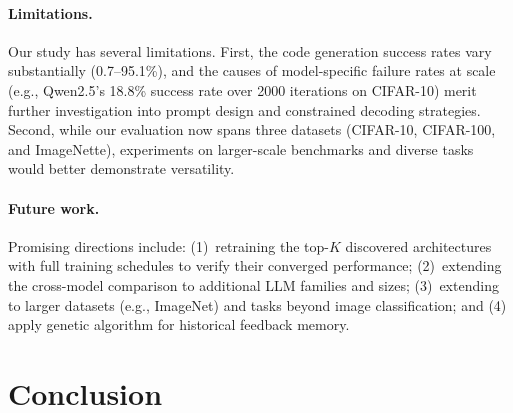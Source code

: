 \documentclass[10pt,twocolumn,letterpaper]{article}
\begin{document}
	\paragraph{Limitations.}
	Our study has several limitations. First, the code generation success rates vary substantially (0.7--95.1\%), and the causes of model-specific failure rates at scale (e.g., Qwen2.5's 18.8\% success rate over 2000 iterations on CIFAR-10) merit further investigation into prompt design and constrained decoding strategies. Second, while our evaluation now spans three datasets (CIFAR-10, CIFAR-100, and ImageNette), experiments on larger-scale benchmarks and diverse tasks would better demonstrate versatility.
	
	\paragraph{Future work.}
	Promising directions include: (1)~retraining the top-$K$ discovered architectures with full training schedules to verify their converged performance; (2)~extending the cross-model comparison to additional LLM families and sizes;  (3)~extending to larger datasets (e.g., ImageNet) and tasks beyond image classification; and (4) apply genetic algorithm for historical feedback memory.
	
	
	\section{Conclusion}
	\label{sec:conclusion}
	
\end{document}
